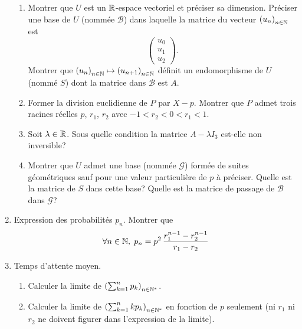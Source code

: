 \begin{enumerate}
\begin{enumerate}
 \item Montrer que $U$ est un $\mathbb{R}$-espace vectoriel et préciser sa dimension. Préciser une base de $U$ (nommée $\mathcal{B}$) dans laquelle la matrice du vecteur $\left( u_n \right)_{n \in \mathbb{N}}$ est 
\begin{displaymath}
 \begin{pmatrix}
  u_0 \\ u_1 \\ u_2
 \end{pmatrix}
.
\end{displaymath}
Montrer que $ \left( u_n \right)_{n \in \mathbb{N}} \mapsto \left( u_{n+1} \right)_{n \in \mathbb{N}}$ définit un endomorphisme de $U$ (nommé $S$) dont la matrice dans $\mathcal{B}$ est $A$.

 \item Former la division euclidienne de $P$ par $X-p$. Montrer que $P$ admet trois racines réelles $p$, $r_1$, $r_2$ avec $-1 < r_2 < 0 < r_1 <1$.
 
 \item Soit $\lambda \in \mathbb{R}$. Sous quelle condition la matrice $A-\lambda I_3$ est-elle non inversible?
 
 \item Montrer que $U$ admet une base (nommée $\mathcal{G}$) formée de suites géométriques sauf pour une valeur particulière de $p$ à préciser. Quelle est la matrice de $S$ dans cette base? Quelle est la matrice de passage de $\mathcal{B}$ dans $\mathcal{G}$?
 
\end{enumerate}
\clearpage
\item Expression des probabilités $p_n$.\newline
Montrer que 
\begin{displaymath}
\forall n \in \mathbb{N}, \; p_n = p^{2}\, \frac{r_1^{n-1}-r_2^{n-1}}{r_1 - r_2} 
\end{displaymath}


\item Temps d'attente moyen.
\begin{enumerate}
 \item Calculer la limite de $\left( \sum_{k=1}^{n}p_k \right)_{n \in \mathbb{N}^*}$.
 \item Calculer la limite de $\left( \sum_{k=1}^{n} kp_k \right)_{n \in \mathbb{N}^*}$ en fonction de $p$ seulement (ni $r_1$ ni $r_2$ ne doivent figurer dans l'expression de la limite).
\end{enumerate}

\end{enumerate}
\clearpage
